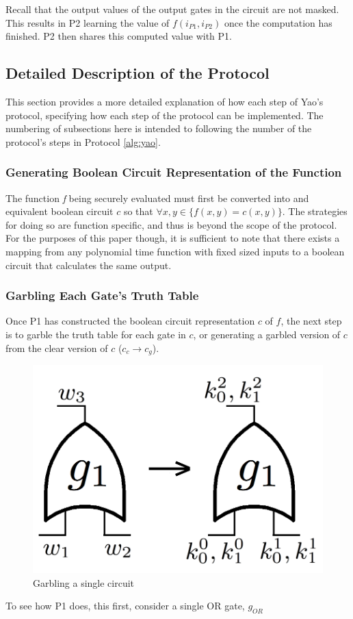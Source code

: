 Recall that the output values of the output gates in the circuit are not masked. This results in \ac{P2} learning the value of $f(i_{P1}, i_{P2})$ once the computation has finished.  \ac{P2} then shares this computed value with \ac{P1}.


\subsection{Detailed Description of the Protocol}

This section provides a more detailed explanation of how each step of Yao's protocol, specifying how each step of the protocol can be implemented.  The numbering of subsections here is intended to following the number of the protocol's steps in Protocol \ref{alg:yao}.


\subsubsection{Generating Boolean Circuit Representation of the Function}

The function \emph{f} being securely evaluated must first be converted into and equivalent boolean circuit $c$ so that $\forall x, y \in \{f(x, y) = c(x, y)\}$. The strategies for doing so are function specific, and thus is beyond the scope of the protocol.  For the purposes of this paper though, it is sufficient to note that there exists a mapping from any polynomial time function with fixed sized inputs to a boolean circuit that calculates the same output\cite{goldreich1987play}.


\subsubsection{Garbling Each Gate's Truth Table}

Once \ac{P1} has constructed the boolean circuit representation $c$ of $f$, the next step is to garble the truth table for each gate in $c$, or generating a garbled version of $c$ from the clear version of $c$ ($c_c \to c_g$).

\begin{figure}[ht!,height=2in]%
  \includegraphics[width=\columnwidth]{images/and_gate}
  \caption{Garbling a single circuit}
  \label{fig:garblecircuit}
\end{figure}

To see how \ac{P1} does, this first, consider a single OR gate, $g_{OR}$
